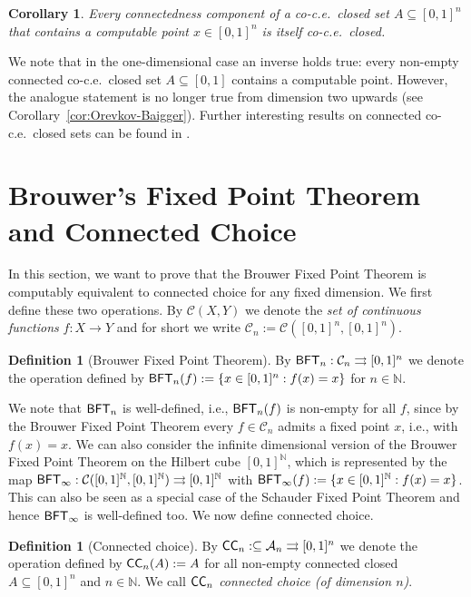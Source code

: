 \documentclass[a4paper]{amsart}
\def\AA{{\mathcal A}}
\def\CC{{\mathcal C}}
\def\IN{{\mathbb{N}}}
\def\In{\subseteq}
\def\mto{\rightrightarrows}
\def\BFT{\mbox{\rm\sffamily BFT}}
\def\ConC{\mbox{\rm\sffamily CC}}
\newtheorem{corollary}[theorem]{Corollary}
\theoremstyle{definition}
\newtheorem{definition}[theorem]{Definition}
\begin{document}
\begin{corollary}
Every connectedness component of a co-c.e.\ closed set $A\In[0,1]^n$ that contains a computable point $x\in[0,1]^n$
is itself co-c.e.\ closed.
\end{corollary}

We note that in the one-dimensional case an inverse holds true: every non-empty connected co-c.e.\ closed set $A\In[0,1]$
contains a computable point. However, the analogue statement is no longer true from dimension two upwards (see Corollary~\ref{cor:Orevkov-Baigger}).
Further interesting results on connected co-c.e.\ closed sets can be found in \cite{Kih12}.


\section{Brouwer's Fixed Point Theorem and Connected Choice}
\label{sec:BFT}

In this section, we want to prove that the Brouwer Fixed Point Theorem is computably equivalent to 
connected choice for any fixed dimension. We first define these two operations. By $\CC(X,Y)$ we denote
the {\em set of continuous functions} $f:X\to Y$ and for short we write $\CC_n:=\CC([0,1]^n,[0,1]^n)$.

\begin{definition}[Brouwer Fixed Point Theorem]
By $\BFT_n:\CC_n\mto[0,1]^n$ we denote the operation defined by $\BFT_n(f):=\{x\in[0,1]^n:f(x)=x\}$
for $n\in\IN$.
\end{definition}

We note that $\BFT_n$ is well-defined, i.e., $\BFT_n(f)$ is non-empty for all $f$, 
since by the Brouwer Fixed Point Theorem every $f\in\CC_n$ admits
a fixed point $x$, i.e., with $f(x)=x$. 
We can also consider the infinite dimensional version of the Brouwer Fixed Point Theorem on the Hilbert cube $[0,1]^\IN$,
which is represented by the map $\BFT_\infty:\CC([0,1]^\IN,[0,1]^\IN)\mto[0,1]^\IN$ with $\BFT_\infty(f):=\{x\in[0,1]^\IN:f(x)=x\}$.
This can also be seen as a special case of the Schauder Fixed Point Theorem and hence $\BFT_\infty$ is well-defined too.
We now define connected choice.

\begin{definition}[Connected choice]
By $\ConC_n:\In\AA_n\mto[0,1]^n$ we denote the operation defined by $\ConC_n(A):=A$ for all non-empty 
connected closed $A\In[0,1]^n$ and $n\in\IN$.
We call $\ConC_n$ {\em connected choice (of dimension $n$)}.
\end{definition}
\end{document}
